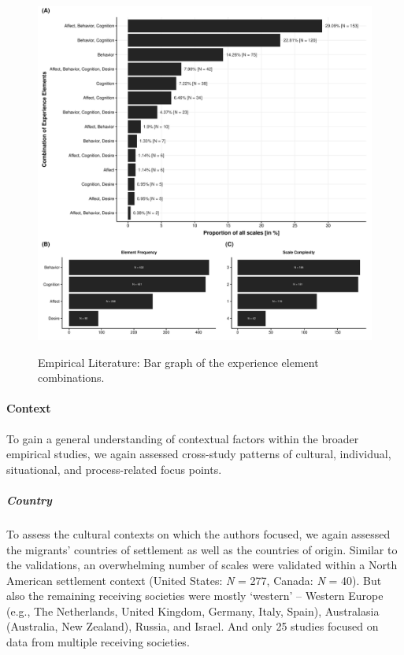 \begin{figure}[h]
\centering
\caption{Empirical Literature: Bar graph of the experience element combinations.}
\includegraphics[width=\textwidth]{Figures/EmpPlotFreq-1}
\label{fig:EmpPlotFreq-1}
\end{figure}



\paragraph{Context}

To gain a general understanding of contextual factors within the broader
empirical studies, we again assessed cross-study patterns of cultural,
individual, situational, and process-related focus points.

\subparagraph{Country}

To assess the cultural contexts on which the authors focused, we again
assessed the migrants' countries of settlement as well as the countries
of origin. Similar to the validations, an overwhelming number of scales
were validated within a North American settlement context (United
States: \textit{N} = 277, Canada: \textit{N} = 40). But also the
remaining receiving societies were mostly `western' -- Western Europe
(e.g., The Netherlands, United Kingdom, Germany, Italy, Spain),
Australasia (Australia, New Zealand), Russia, and Israel. And only 25
studies focused on data from multiple receiving societies.

